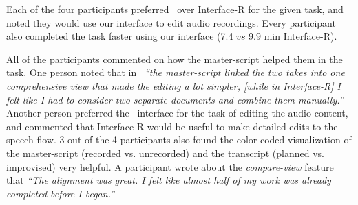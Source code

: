 Each of the four participants preferred \systemname\ over Interface-R for the given task, and noted they would use
our interface to edit audio recordings. Every participant also
completed the task faster using our interface (7.4 $vs$ 9.9 min Interface-R). 


All of the participants commented on how the master-script helped them in the task. One person noted that in \systemname\ \textit{``the master-script linked the two takes into one comprehensive view
that made the editing a lot simpler, [while in Interface-R] I felt like I had to consider two separate documents and combine them manually.''} Another person preferred the \systemname\ interface for the task of editing the audio content, and commented that Interface-R would be useful to make detailed edits to the speech flow. 3 out of the 4 participants also found the color-coded visualization of the master-script (recorded vs. unrecorded) and the transcript (planned vs. improvised) very helpful. A participant wrote about the \textit{compare-view} feature that \textit{``The alignment was great. I felt like almost half of my work was
already completed before I began.''} 


